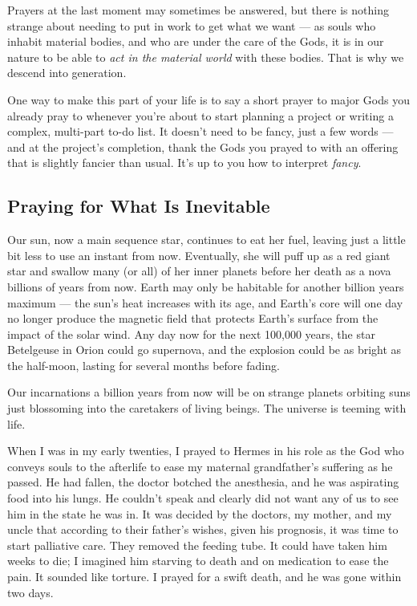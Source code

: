 \documentclass[
]{book}
\begin{document}
Prayers at the last moment may sometimes be answered, but there is nothing strange about needing to put in work to get what we want --- as souls who inhabit material bodies, and who are under the care of the Gods, it is in our nature to be able to \emph{act in the material world} with these bodies. That is why we descend into generation.

One way to make this part of your life is to say a short prayer to major Gods you already pray to whenever you're about to start planning a project or writing a complex, multi-part to-do list. It doesn't need to be fancy, just a few words --- and at the project's completion, thank the Gods you prayed to with an offering that is slightly fancier than usual. It's up to you how to interpret \emph{fancy}.

\hypertarget{praying-for-what-is-inevitable}{%
\subsection{Praying for What Is Inevitable}\label{praying-for-what-is-inevitable}}

Our sun, now a main sequence star, continues to eat her fuel, leaving just a little bit less to use an instant from now. Eventually, she will puff up as a red giant star and swallow many (or all) of her inner planets before her death as a nova billions of years from now. Earth may only be habitable for another billion years maximum --- the sun's heat increases with its age, and Earth's core will one day no longer produce the magnetic field that protects Earth's surface from the impact of the solar wind. Any day now for the next 100,000 years, the star Betelgeuse in Orion could go supernova, and the explosion could be as bright as the half-moon, lasting for several months before fading.

Our incarnations a billion years from now will be on strange planets orbiting suns just blossoming into the caretakers of living beings. The universe is teeming with life.

When I was in my early twenties, I prayed to Hermes in his role as the God who conveys souls to the afterlife to ease my maternal grandfather's suffering as he passed. He had fallen, the doctor botched the anesthesia, and he was aspirating food into his lungs. He couldn't speak and clearly did not want any of us to see him in the state he was in. It was decided by the doctors, my mother, and my uncle that according to their father's wishes, given his prognosis, it was time to start palliative care. They removed the feeding tube. It could have taken him weeks to die; I imagined him starving to death and on medication to ease the pain. It sounded like torture. I prayed for a swift death, and he was gone within two days.
\end{document}
